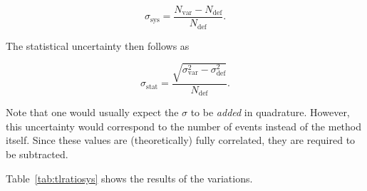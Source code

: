 \begin{equation}
  \label{eq:frsysabs}
  \sigma_{\text{sys}} = \frac{N_{\text{var}} - N_{\text{def}}}{N_{\text{def}}}.
\end{equation}

\noindent The statistical uncertainty then follows as

\begin{equation}
  \label{eq:frstatabs}
  \sigma_{\text{stat}} = \frac{\sqrt{\sigma_{\text{var}}^2 - \sigma_{\text{def}}^2}}{N_{\text{def}}}.
\end{equation}

\noindent Note that one would usually expect the $\sigma$ to be \textit{added} in quadrature. However, this uncertainty would correspond to the number of events instead of the method itself. Since these values are (theoretically) fully correlated, they are required to be subtracted.

Table~\ref{tab:tlratiosys} shows the results of the variations.

